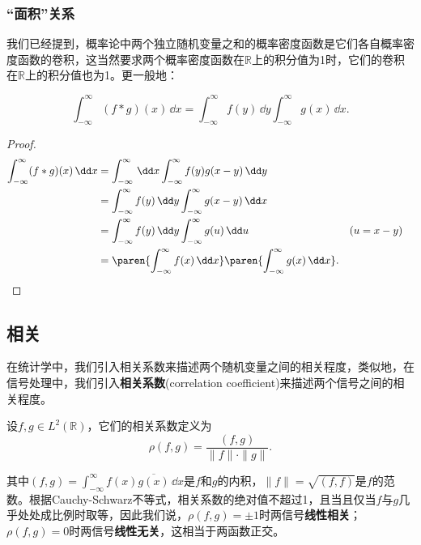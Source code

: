 \subsubsection{“面积”关系}

我们已经提到，概率论中两个独立随机变量之和的概率密度函数是它们各自概率密度函数的卷积，这当然要求两个概率密度函数在$\mathbb{R}$上的积分值为1时，它们的卷积在$\mathbb{R}$上的积分值也为1。更一般地：
\begin{proposition}[卷积的“面积”关系]
    \begin{equation}
        \int_{-\infty}^{\infty}(f*g)(x)\,\dd x=\int_{-\infty}^{\infty}f(y)\,\dd y\int_{-\infty}^{\infty}g(x)\,\dd x.
    \end{equation}
\end{proposition}
\begin{proof}
    \begin{align}
        \int_{-\infty}^{\infty}(f*g)(x)\,\dd x & =\int_{-\infty}^{\infty}\,\dd x\int_{-\infty}^{\infty}f(y)g(x-y)\,\dd y\nonumber                                   \\
                                               & =\int_{-\infty}^{\infty}f(y)\,\dd y\int_{-\infty}^{\infty}g(x-y)\,\dd x\nonumber                                   \\
                                               & =\int_{-\infty}^{\infty}f(y)\,\dd y\int_{-\infty}^{\infty}g(u)\,\dd u                           && (u=x-y)\nonumber \\
                                               & =\paren{\int_{-\infty}^{\infty}f(x)\,\dd x}\paren{\int_{-\infty}^{\infty}g(x)\,\dd x}.
    \end{align}
\end{proof}

\subsection{相关}\label{sub:correlation}
在统计学中，我们引入相关系数来描述两个随机变量之间的相关程度，类似地，在信号处理中，我们引入\textbf{相关系数}(correlation coefficient)来描述两个信号之间的相关程度。
\begin{definition}[相关系数]
    设$f,g\in L^2(\mathbb{R})$，它们的相关系数定义为
    \begin{equation}
        \rho(f,g)=\frac{(f,g)}{\|f\|\cdot\|g\|}.
    \end{equation}
\end{definition}
其中$(f,g)=\int_{-\infty}^{\infty}f(x)\overline{g(x)}\,\dd x$是$f$和$g$的内积，$\|f\|=\sqrt{(f,f)}$是$f$的范数。根据Cauchy-Schwarz不等式，相关系数的绝对值不超过1，且当且仅当$f$与$g$几乎处处成比例时取等，因此我们说，$\rho(f,g)=\pm 1$时两信号\textbf{线性相关}；$\rho(f,g)=0$时两信号\textbf{线性无关}，这相当于两函数正交。

